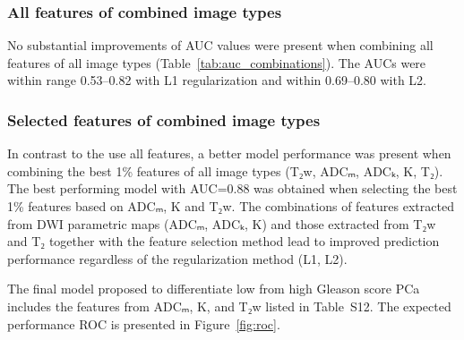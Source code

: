 \subsubsection{All features of combined image types}

No substantial improvements of AUC values were present when combining all
features of all image types (Table~\ref{tab:auc_combinations}). The AUCs were
within range 0.53--0.82 with L1 regularization and within 0.69--0.80 with L2.


\subsubsection{Selected features of combined image types}

In contrast to the use all features, a better model performance was present when
combining the best 1\% features of all image types (T₂w, ADCₘ, ADCₖ, K,
T₂). The best performing model with AUC=0.88 was obtained when selecting the
best 1\% features based on ADCₘ, K and T₂w. The combinations of features
extracted from DWI parametric maps (ADCₘ, ADCₖ, K) and those extracted from T₂w
and T₂ together with the feature selection method lead to improved prediction
performance regardless of the regularization method (L1, L2).

The final model proposed to differentiate low from high Gleason score PCa
includes the features from ADCₘ, K, and T₂w listed in Table~S12. The expected
performance ROC is presented in Figure~\ref{fig:roc}.
